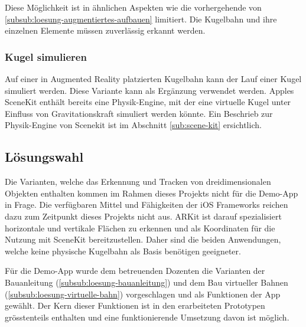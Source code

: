 Diese Möglichkeit ist in ähnlichen Aspekten wie die vorhergehende von \ref{subsub:loesung-augmentiertes-aufbauen} limitiert.
Die Kugelbahn und ihre einzelnen Elemente müssen zuverlässig erkannt werden.

\subsubsection{Kugel simulieren}

Auf einer in Augmented Reality platzierten Kugelbahn kann der Lauf einer Kugel simuliert werden.
Diese Variante kann als Ergänzung verwendet werden.
Apples SceneKit enthält bereits eine Physik-Engine, mit der eine virtuelle Kugel unter Einfluss von Gravitationskraft simuliert werden könnte. Ein Beschrieb zur Physik-Engine von Scenekit ist im Abschnitt \ref{sub:scene-kit} ersichtlich.

\subsection{Lösungswahl}\label{sub:loesungswahl}

Die Varianten, welche das Erkennung und Tracken von dreidimensionalen Objekten enthalten kommen im Rahmen dieses Projekts nicht für die Demo-App in Frage.
Die verfügbaren Mittel und Fähigkeiten der iOS Frameworks reichen dazu zum Zeitpunkt dieses Projekts nicht aus.
ARKit ist darauf spezialisiert horizontale und vertikale Flächen zu erkennen und als Koordinaten für die Nutzung mit SceneKit bereitzustellen.
Daher sind die beiden Anwendungen, welche keine physische Kugelbahn als Basis benötigen geeigneter.

Für die Demo-App wurde dem betreuenden Dozenten die Varianten der Bauanleitung (\ref{subsub:loesung-bauanleitung}) und dem Bau virtueller Bahnen (\ref{subsub:loesung-virtuelle-bahn}) vorgeschlagen und als Funktionen der App gewählt.
Der Kern dieser Funktionen ist in den erarbeiteten Prototypen grösstenteils enthalten und eine funktionierende Umsetzung davon ist möglich.

